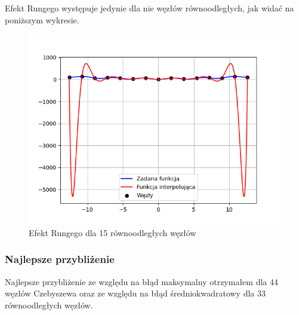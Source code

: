 \documentclass{article}
\begin{document}
Efekt Rungego występuje jedynie dla nie węzłów równoodległych, jak widać na poniższym wykresie.

\begin{figure}[H]
\centering
  \begin{minipage}[b]{0.49\textwidth}
    \includegraphics[width=\textwidth]{img14.png}
    \caption{Efekt Rungego dla 15 równoodległych węzłów}
  \end{minipage}
\end{figure}

\subsubsection{Najlepsze przybliżenie}

Najlepsze przybliżenie ze względu na błąd maksymalny otrzymałem dla 44 węzłów Czebyszewa oraz ze względu na błąd średniokwadratowy dla 33 równoodległych węzłów.
\end{document}
